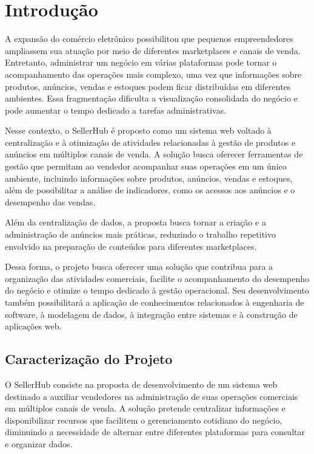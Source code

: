 \chapter{Introdução}
\label{cap:introducao}

A expansão do comércio eletrônico possibilitou que pequenos empreendedores ampliassem sua atuação por meio de diferentes marketplaces e canais de venda. Entretanto, administrar um negócio em várias plataformas pode tornar o acompanhamento das operações mais complexo, uma vez que informações sobre produtos, anúncios, vendas e estoques podem ficar distribuídas em diferentes ambientes. Essa fragmentação dificulta a visualização consolidada do negócio e pode aumentar o tempo dedicado a tarefas administrativas.

Nesse contexto, o SellerHub é proposto como um sistema web voltado à centralização e à otimização de atividades relacionadas à gestão de produtos e anúncios em múltiplos canais de venda. A solução busca oferecer ferramentas de gestão que permitam ao vendedor acompanhar suas operações em um único ambiente, incluindo informações sobre produtos, anúncios, vendas e estoques, além de possibilitar a análise de indicadores, como os acessos aos anúncios e o desempenho das vendas.

Além da centralização de dados, a proposta busca tornar a criação e a administração de anúncios mais práticas, reduzindo o trabalho repetitivo envolvido na preparação de conteúdos para diferentes marketplaces.

Dessa forma, o projeto busca oferecer uma solução que contribua para a organização das atividades comerciais, facilite o acompanhamento do desempenho do negócio e otimize o tempo dedicado à gestão operacional. Seu desenvolvimento também possibilitará a aplicação de conhecimentos relacionados à engenharia de software, à modelagem de dados, à integração entre sistemas e à construção de aplicações web.
\section{Caracterização do Projeto}
O SellerHub consiste na proposta de desenvolvimento de um sistema web destinado a auxiliar vendedores na administração de suas operações comerciais em múltiplos canais de venda. A solução pretende centralizar informações e disponibilizar recursos que facilitem o gerenciamento cotidiano do negócio, diminuindo a necessidade de alternar entre diferentes plataformas para consultar e organizar dados.

